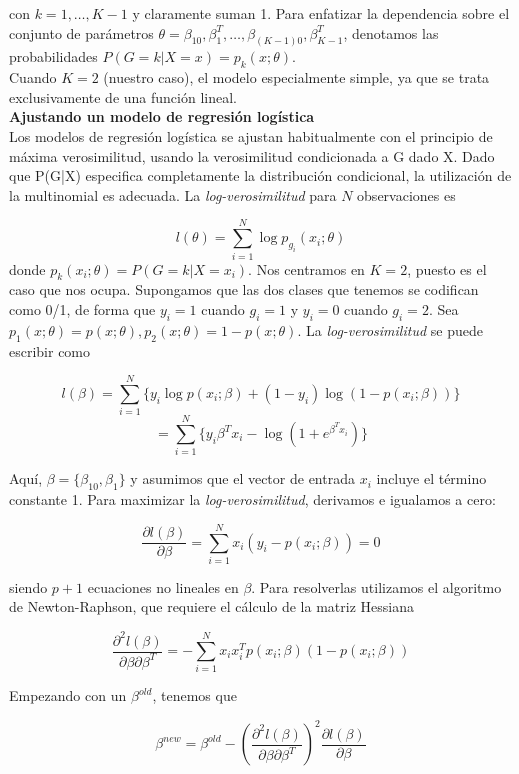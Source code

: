   con $k=1,\dots,K-1$ y claramente suman 1. Para enfatizar la dependencia sobre el conjunto de parámetros $\theta = {\beta_{10},\beta_1^T,\dots,\beta_{(K-1)0},\beta_{K-1}^T}$, denotamos las probabilidades $P(G=k|X=x) = p_k(x;\theta)$. \\
  
  Cuando $K=2$ (nuestro caso), el modelo especialmente simple, ya que se trata exclusivamente de una función lineal. \\
  
  \textbf{Ajustando un modelo de regresión logística} \\
  
  Los modelos de regresión logística se ajustan habitualmente con el principio de máxima verosimilitud, usando la verosimilitud condicionada a G dado X. Dado que P(G|X) especifica completamente la distribución condicional, la utilización de la multinomial es adecuada. La \textit{log-verosimilitud} para $N$ observaciones es
  
  $$l(\theta) = \sum_{i=1}^{N} \log p_{g_i}(x_i;\theta)$$
  donde $p_k(x_i;\theta) = P(G=k|X=x_i)$. Nos centramos en $K=2$, puesto es el caso que nos ocupa. Supongamos que las dos clases que tenemos se codifican como 0/1, de forma que $y_i=1$ cuando $g_i=1$ y $y_i=0$ cuando $g_i=2$. Sea $p_1(x;\theta) = p(x;\theta), p_2(x;\theta) = 1 -p(x;\theta)$. La \textit{log-verosimilitud} se puede escribir como
  
  $$l(\beta) = \sum_{i=1}^{N} \{ y_i \log p(x_i;\beta)+(1-y_i) \log(1-p(x_i;\beta)) \}$$
  $$ = \sum_{i=1}^{N} \{y_i \beta^T x_i - \log(1+e^{\beta^T x_i}) \}$$
  
  Aquí, $\beta = \{\beta_{10},\beta_1 \}$ y asumimos que el vector de entrada $x_i$ incluye el término constante 1. Para maximizar la \textit{log-verosimilitud}, derivamos e igualamos a cero:
  
  $$\frac{\partial l(\beta)}{\partial \beta} = \sum_{i=1}^{N} x_i (y_i -p(x_i;\beta))=0$$
  
  siendo $p+1$ ecuaciones no lineales en $\beta$.  Para resolverlas utilizamos el algoritmo de Newton-Raphson, que requiere el cálculo de la matriz Hessiana
  
  $$\frac{\partial^2 l(\beta)}{\partial \beta \partial \beta^T} = - \sum_{i=1}^{N} x_i x_i^T p(x_i;\beta)(1-p(x_i;\beta))$$
  
  Empezando con un $\beta^{old}$, tenemos que
  
  $$\beta^{new} = \beta^{old} - \left(\frac{\partial^2 l(\beta)}{\partial \beta \partial \beta^T}\right)^2 \frac{\partial l(\beta)}{\partial \beta}$$
  
